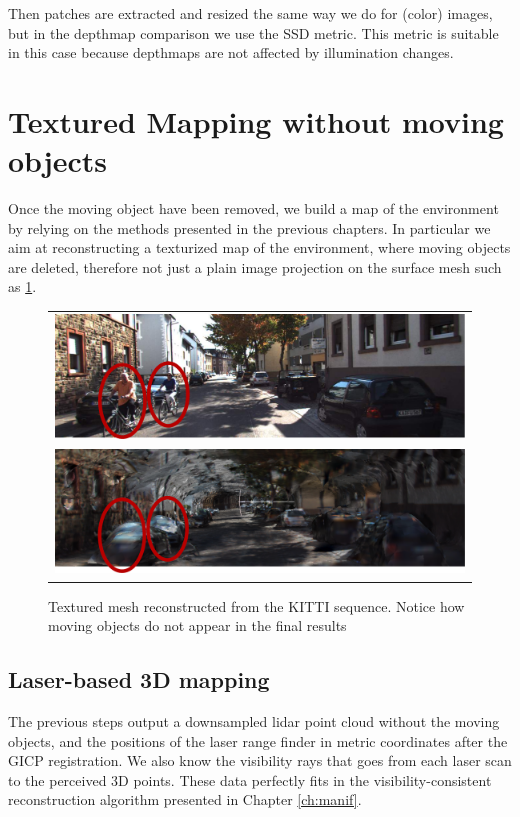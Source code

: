 Then patches are extracted and resized the same way we do for (color) images, but in the depthmap comparison we use the SSD metric. This metric is suitable in this case because depthmaps are not affected by illumination changes.



\section{Textured Mapping without moving objects}
Once the moving object have been removed, we build a map of the environment by relying on the methods presented in the previous chapters.
In particular we aim at reconstructing a texturized map of the environment, where moving objects are deleted, therefore not just a plain image projection on the surface mesh such as \ref{fig:recwithoutmoving}.



\begin{figure}[tp]
 \centering
    \begin{tabular}{c}
    \includegraphics[width=0.92\columnwidth]{./img/ch-laser/originaFrame}\\
    \includegraphics[width=0.92\columnwidth]{./img/ch-laser/texuredRec}\\
 \end{tabular}
 \caption{Textured mesh reconstructed from the KITTI sequence. Notice how moving objects do not appear in the final results}
 \label{fig:recwithoutmoving}
\end{figure}



\subsection{Laser-based 3D mapping}
The previous steps output a downsampled lidar point cloud without the moving objects, and the positions of the laser range finder in metric coordinates after the GICP registration.
We also know the visibility rays that goes from each laser scan to the perceived 3D points. These data perfectly fits in the visibility-consistent reconstruction algorithm presented in Chapter \ref{ch:manif}.

